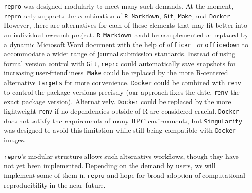 \documentclass[psych,tutorial,accept,moreauthors,pdftex]{Definitions/mdpi}
\begin{document}
\begin{paracol}{2}
\texttt{repro} was designed modularly to meet many such demands. At the
moment, \texttt{repro} only supports the combination of
\texttt{R\ Markdown}, \texttt{Git}, \texttt{Make}, and \texttt{Docker}.
However, there are alternatives for each of these elements that may fit
better into an individual research project. \texttt{R\ Markdown} could
be complemented or replaced by a dynamic Microsoft Word document with
the help of \texttt{officer}~\citep{officer} or \texttt{officedown}
\citep{officedown} to accommodate a wider range of journal submission
standards. Instead of using formal version control with \texttt{Git},
\texttt{repro} could automatically save snapshots for increasing
user-friendliness. \texttt{Make} could be replaced by the more
R-centered alternative \texttt{targets} for more convenience.
\texttt{Docker} could be combined with \texttt{renv}~\citep{R-renv} to
control the package versions precisely (our approach fixes the date,
\texttt{renv} the exact package version). Alternatively, \texttt{Docker}
could be replaced by the more lightweight \texttt{renv} if no
dependencies outside of R are considered crucial. \texttt{Docker} does
not satisfy the requirements of many HPC environments, but
\texttt{Singularity} was designed to avoid this limitation while still
being compatible with \texttt{Docker} images.

\texttt{repro}'s modular structure allows such alternative workflows,
though they have not yet been implemented. Depending on the demand by
users, we will implement some of them in \texttt{repro} and hope for
broad adoption of computational reproducibility in the near~future.



\vspace{6pt}





\end{paracol}
\end{document}
